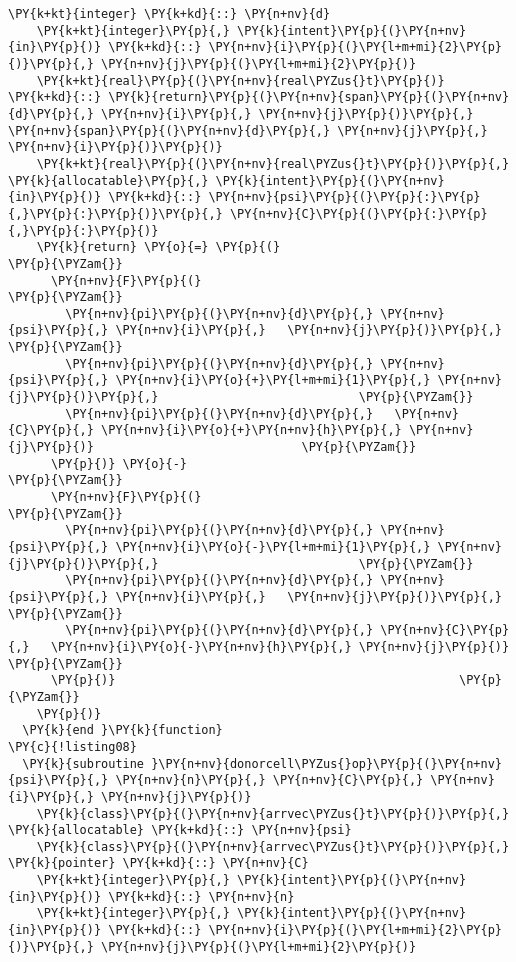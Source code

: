 \begin{Verbatim}[commandchars=\\\{\}]
    \PY{k+kt}{integer} \PY{k+kd}{::} \PY{n+nv}{d}
    \PY{k+kt}{integer}\PY{p}{,} \PY{k}{intent}\PY{p}{(}\PY{n+nv}{in}\PY{p}{)} \PY{k+kd}{::} \PY{n+nv}{i}\PY{p}{(}\PY{l+m+mi}{2}\PY{p}{)}\PY{p}{,} \PY{n+nv}{j}\PY{p}{(}\PY{l+m+mi}{2}\PY{p}{)} 
    \PY{k+kt}{real}\PY{p}{(}\PY{n+nv}{real\PYZus{}t}\PY{p}{)} \PY{k+kd}{::} \PY{k}{return}\PY{p}{(}\PY{n+nv}{span}\PY{p}{(}\PY{n+nv}{d}\PY{p}{,} \PY{n+nv}{i}\PY{p}{,} \PY{n+nv}{j}\PY{p}{)}\PY{p}{,} \PY{n+nv}{span}\PY{p}{(}\PY{n+nv}{d}\PY{p}{,} \PY{n+nv}{j}\PY{p}{,} \PY{n+nv}{i}\PY{p}{)}\PY{p}{)}
    \PY{k+kt}{real}\PY{p}{(}\PY{n+nv}{real\PYZus{}t}\PY{p}{)}\PY{p}{,} \PY{k}{allocatable}\PY{p}{,} \PY{k}{intent}\PY{p}{(}\PY{n+nv}{in}\PY{p}{)} \PY{k+kd}{::} \PY{n+nv}{psi}\PY{p}{(}\PY{p}{:}\PY{p}{,}\PY{p}{:}\PY{p}{)}\PY{p}{,} \PY{n+nv}{C}\PY{p}{(}\PY{p}{:}\PY{p}{,}\PY{p}{:}\PY{p}{)}           
    \PY{k}{return} \PY{o}{=} \PY{p}{(}                                         \PY{p}{\PYZam{}}
      \PY{n+nv}{F}\PY{p}{(}                                               \PY{p}{\PYZam{}}
        \PY{n+nv}{pi}\PY{p}{(}\PY{n+nv}{d}\PY{p}{,} \PY{n+nv}{psi}\PY{p}{,} \PY{n+nv}{i}\PY{p}{,}   \PY{n+nv}{j}\PY{p}{)}\PY{p}{,}                            \PY{p}{\PYZam{}}
        \PY{n+nv}{pi}\PY{p}{(}\PY{n+nv}{d}\PY{p}{,} \PY{n+nv}{psi}\PY{p}{,} \PY{n+nv}{i}\PY{o}{+}\PY{l+m+mi}{1}\PY{p}{,} \PY{n+nv}{j}\PY{p}{)}\PY{p}{,}                            \PY{p}{\PYZam{}}
        \PY{n+nv}{pi}\PY{p}{(}\PY{n+nv}{d}\PY{p}{,}   \PY{n+nv}{C}\PY{p}{,} \PY{n+nv}{i}\PY{o}{+}\PY{n+nv}{h}\PY{p}{,} \PY{n+nv}{j}\PY{p}{)}                             \PY{p}{\PYZam{}}
      \PY{p}{)} \PY{o}{-}                                              \PY{p}{\PYZam{}}
      \PY{n+nv}{F}\PY{p}{(}                                               \PY{p}{\PYZam{}}
        \PY{n+nv}{pi}\PY{p}{(}\PY{n+nv}{d}\PY{p}{,} \PY{n+nv}{psi}\PY{p}{,} \PY{n+nv}{i}\PY{o}{-}\PY{l+m+mi}{1}\PY{p}{,} \PY{n+nv}{j}\PY{p}{)}\PY{p}{,}                            \PY{p}{\PYZam{}}
        \PY{n+nv}{pi}\PY{p}{(}\PY{n+nv}{d}\PY{p}{,} \PY{n+nv}{psi}\PY{p}{,} \PY{n+nv}{i}\PY{p}{,}   \PY{n+nv}{j}\PY{p}{)}\PY{p}{,}                            \PY{p}{\PYZam{}}
        \PY{n+nv}{pi}\PY{p}{(}\PY{n+nv}{d}\PY{p}{,} \PY{n+nv}{C}\PY{p}{,}   \PY{n+nv}{i}\PY{o}{-}\PY{n+nv}{h}\PY{p}{,} \PY{n+nv}{j}\PY{p}{)}                             \PY{p}{\PYZam{}}
      \PY{p}{)}                                                \PY{p}{\PYZam{}}
    \PY{p}{)}
  \PY{k}{end }\PY{k}{function}
\PY{c}{!listing08}
  \PY{k}{subroutine }\PY{n+nv}{donorcell\PYZus{}op}\PY{p}{(}\PY{n+nv}{psi}\PY{p}{,} \PY{n+nv}{n}\PY{p}{,} \PY{n+nv}{C}\PY{p}{,} \PY{n+nv}{i}\PY{p}{,} \PY{n+nv}{j}\PY{p}{)}  
    \PY{k}{class}\PY{p}{(}\PY{n+nv}{arrvec\PYZus{}t}\PY{p}{)}\PY{p}{,} \PY{k}{allocatable} \PY{k+kd}{::} \PY{n+nv}{psi}
    \PY{k}{class}\PY{p}{(}\PY{n+nv}{arrvec\PYZus{}t}\PY{p}{)}\PY{p}{,} \PY{k}{pointer} \PY{k+kd}{::} \PY{n+nv}{C}
    \PY{k+kt}{integer}\PY{p}{,} \PY{k}{intent}\PY{p}{(}\PY{n+nv}{in}\PY{p}{)} \PY{k+kd}{::} \PY{n+nv}{n}
    \PY{k+kt}{integer}\PY{p}{,} \PY{k}{intent}\PY{p}{(}\PY{n+nv}{in}\PY{p}{)} \PY{k+kd}{::} \PY{n+nv}{i}\PY{p}{(}\PY{l+m+mi}{2}\PY{p}{)}\PY{p}{,} \PY{n+nv}{j}\PY{p}{(}\PY{l+m+mi}{2}\PY{p}{)} 
    

\end{Verbatim}

